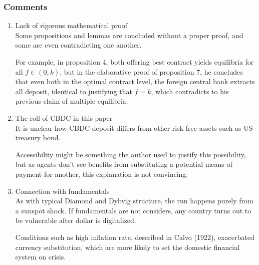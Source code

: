 \begin{frame}[allowframebreaks]
    \frametitle{Comments}
    
    \begin{enumerate}
        \item Lack of rigorous mathematical proof \\[2em]
        
        Some propositions and lemmas are concluded without a proper proof, 
        and some are even contradicting one another. 

        For example, in proposition 4, both offering best contract yields equilibria for 
        all $f\in(0,k)$, but in the elaborative proof of proposition 7, he concludes that 
        even both in the optimal contract level, the foreign central bank extracts all deposit, 
        identical to justifying that $f=k$, which contradicts to his previous claim of multiple equilibria.

        \item The roll of CBDC in this paper\\[2em]
        
        It is unclear how CBDC deposit differs from other risk-free assets such as 
        US treasury bond. 

        Accessibility might be something the author used to justify this possibility, but as agents don't see benefits from 
        substituting a potential means of payment for another, this explanation is not convincing. 

        \framebreak 

        \item Connection with fundamentals \\[2em]
        
        As with typical Diamond and Dybvig structure, the run happens purely from a sunspot shock. 
        If fundamentals are not considers, any country turns out to be vulnerable after dollar is digitalized. 

        Conditions such as high inflation rate, described in Calvo (1922), exacerbated currency substitution, 
        which are more likely to set the domestic financial system on crisis.
        
 
    \end{enumerate}

\end{frame}

